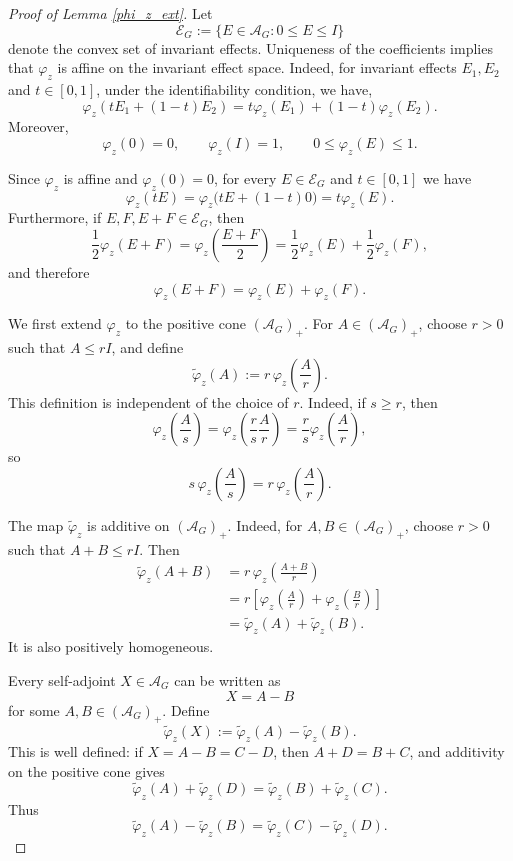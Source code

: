 \documentclass{article}
\theoremstyle{named}
\theoremstyle{named1}
\theoremstyle{plain}
\theoremstyle{remark}
\begin{document}
\begin{proof}[Proof of Lemma \ref{phi_z_ext}]

Let
\[
\mathcal{E}_G
:=
\{E\in\mathcal{A}_G:0\leq E\leq I\}
\]
denote the convex set of invariant effects. Uniqueness of the coefficients implies that $\varphi_z$ is affine on the
invariant effect space. Indeed, for invariant effects $E_1,E_2$ and
$t\in[0,1]$, under the identifiability condition, we have,
\[
    \varphi_z(tE_1+(1-t)E_2)
    =
    t\varphi_z(E_1)+(1-t)\varphi_z(E_2).
\]
Moreover,
\[
    \varphi_z(0)=0,
    \qquad
    \varphi_z(I)=1,
    \qquad
    0\leq \varphi_z(E)\leq1.
\]


 Since $\varphi_z$ is affine and
$\varphi_z(0)=0$, for every $E\in\mathcal{E}_G$ and $t\in[0,1]$ we have
\[
\varphi_z(tE)
=
\varphi_z\bigl(tE+(1-t)0\bigr)
=
t\varphi_z(E).
\]
Furthermore, if $E,F,E+F\in\mathcal{E}_G$, then
\[
\frac{1}{2}\varphi_z(E+F)
=
\varphi_z\left(\frac{E+F}{2}\right)
=
\frac{1}{2}\varphi_z(E)+\frac{1}{2}\varphi_z(F),
\]
and therefore
\[
\varphi_z(E+F)=\varphi_z(E)+\varphi_z(F).
\]

We first extend $\varphi_z$ to the positive cone
$(\mathcal{A}_G)_+$. For $A\in(\mathcal{A}_G)_+$, choose $r>0$ such that
$A\leq rI$, and define
\[
\widetilde{\varphi}_z(A)
:=
r\,\varphi_z\left(\frac{A}{r}\right).
\]
This definition is independent of the choice of $r$. Indeed, if $s\geq r$,
then
\[
\varphi_z\left(\frac{A}{s}\right)
=
\varphi_z\left(\frac{r}{s}\frac{A}{r}\right)
=
\frac{r}{s}\varphi_z\left(\frac{A}{r}\right),
\]
so
\[
s\,\varphi_z\left(\frac{A}{s}\right)
=
r\,\varphi_z\left(\frac{A}{r}\right).
\]

The map $\widetilde{\varphi}_z$ is additive on $(\mathcal{A}_G)_+$.
Indeed, for $A,B\in(\mathcal{A}_G)_+$, choose $r>0$ such that
$A+B\leq rI$. Then
\[
\begin{aligned}
\widetilde{\varphi}_z(A+B)
&=
r\,\varphi_z\left(\frac{A+B}{r}\right)\\
&=
r\left[
\varphi_z\left(\frac{A}{r}\right)
+
\varphi_z\left(\frac{B}{r}\right)
\right]\\
&=
\widetilde{\varphi}_z(A)+\widetilde{\varphi}_z(B).
\end{aligned}
\]
It is also positively homogeneous.

Every self-adjoint $X\in\mathcal{A}_G$ can be written as
\[
X=A-B
\]
for some $A,B\in(\mathcal{A}_G)_+$. Define
\[
\widetilde{\varphi}_z(X)
:=
\widetilde{\varphi}_z(A)-\widetilde{\varphi}_z(B).
\]
This is well defined: if $X=A-B=C-D$, then $A+D=B+C$, and additivity on
the positive cone gives
\[
\widetilde{\varphi}_z(A)+\widetilde{\varphi}_z(D)
=
\widetilde{\varphi}_z(B)+\widetilde{\varphi}_z(C).
\]
Thus
\[
\widetilde{\varphi}_z(A)-\widetilde{\varphi}_z(B)
=
\widetilde{\varphi}_z(C)-\widetilde{\varphi}_z(D).
\]


\end{proof}
\end{document}
